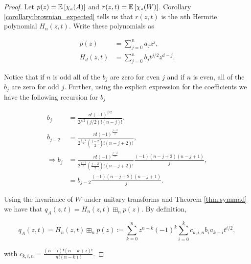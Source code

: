     \begin{proof}
        
        Let $p(z) = \mathbb E \left[ \chi_z(A) \right]$ and $r(z,t) = \mathbb E \left[ \chi_z(W) \right]$. Corollary \ref{corollary:brownian_expected} tells us that $r(z,t)$ is the $n$th Hermite polynomial $H_n(z,t)$. Write these polynomials as

        \begin{align*}
            p(z)     &= \sum_{j=0}^n a_j z^j,\\ 
            H_d(z,t) &= \sum_{j=0}^n b_j t^{j/2} z^{d-j}.
        \end{align*}
        
        Notice that if $n$ is odd all of the $b_j$ are zero for even $j$  and if $n$ is even, all of the $b_j$ are zero for odd $j$. Further, using the explicit expression for the coefficients we have the following recursion for $b_j$

        \begin{align}
            b_{j} &= \frac{n! (-1)^{j/2}}{2^{j/2} (j/2)! (n-j)!},\\ 
            b_{j-2} &= \frac{n! (-1)^{\frac{j-2}{2}}}{2^{\frac{j-2}{2}} \left(\frac{j-2}{2}\right)! (n-j+2)!},\\ 
            \Rightarrow b_{j} &= \frac{n! (-1)^{\frac{j-2}{2}}}{2^{\frac{j-2}{2}} \left(\frac{j-2}{2}\right)! (n-j+2)!} \frac{(-1)(n-j+2)(n-j+1)}{j},\\  
            &= b_{j-2} \frac{(-1)(n-j+2)(n-j+1)}{j}. \label{eq:hermite_coef_recurr}
        \end{align}

        Using the invariance of $W$ under unitary transforms and Theorem \ref{thm:symmad} we have that $q_A(z,t) = H_n(z,t) \boxplus_n p(z)$. By definition, 

        \begin{equation*}
            q_A(z,t) = H_n(z,t) \boxplus_n p(z) \coloneqq \sum_{k=0}^n z^{n-k}(-1)^k \sum_{i=0}^k c_{k,i,n} b_i a_{k-i} t^{i/2},
        \end{equation*} 

        \noindent with $c_{k,i,n} = \frac{(n-i)!(n-k+i)!}{n!(n-k)!}$.




\end{proof}
